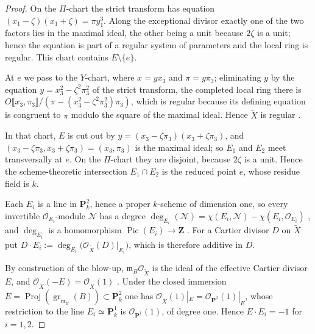 \documentclass[10pt]{amsart}
\DeclareMathOperator{\Pic}{Pic}
\theoremstyle{remark}
\begin{document}
\begin{proof}
	On the \(\Pi\)-chart the strict transform has equation
	\((x_1-\zeta)(x_1+\zeta)=\pi y_1^3\).  Along the exceptional divisor
	exactly one of the two factors lies in the maximal ideal, the other
	being a unit because \(2\zeta\) is a unit; hence the equation is part of a
	regular system of parameters and the local ring is regular.  This chart
	contains \(E\setminus\{e\}\).
	
	At \(e\) we pass to the \(Y\)-chart, where \(x=yx_3\) and
	\(\pi=y\pi_3\); eliminating \(y\) by the equation
	\(y=x_3^2-\zeta^2\pi_3^2\) of the strict transform, the completed local
	ring there is
	\(O\llbracket x_3,\pi_3\rrbracket/(\pi-(x_3^2-\zeta^2\pi_3^2)\pi_3)\),
	which is regular because its defining equation is congruent to \(\pi\)
	modulo the square of the maximal ideal.  Hence \(\widetilde X\) is
	regular \cite[Tag~07NY]{StacksProject}.
	
	In that chart, \(E\) is cut out by
	\(y=(x_3-\zeta\pi_3)(x_3+\zeta\pi_3)\), and
	\((x_3-\zeta\pi_3,x_3+\zeta\pi_3)=(x_3,\pi_3)\) is the maximal ideal;
	so \(E_1\) and \(E_2\) meet transversally at \(e\).  On the
	\(\Pi\)-chart they are disjoint, because \(2\zeta\) is a unit.  Hence the
	scheme-theoretic intersection \(E_1\cap E_2\) is the reduced point
	\(e\), whose residue field is \(k\).
	
	
	
	Each \(E_i\) is a line in \(\mathbf P^2_k\), hence a proper \(k\)-scheme
	of dimension one, so every invertible \(\mathcal O_{E_i}\)-module
	\(\mathcal N\) has a degree
	\(\deg_{E_i}(\mathcal N)=\chi(E_i,\mathcal N)-\chi(E_i,\mathcal O_{E_i})\)
	\cite[Tag~0AYR]{StacksProject}, and \(\deg_{E_i}\) is a homomorphism
	\(\Pic(E_i)\to\mathbf Z\) \cite[Tag~0AYX]{StacksProject}.  For a Cartier
	divisor \(D\) on \(\widetilde X\) put
	\(D\cdot E_i:=\deg_{E_i}\bigl(\mathcal O_{\widetilde X}(D)|_{E_i}\bigr)\),
	which is therefore additive in \(D\).
	
	By construction of the blow-up, \(\mathfrak m_B\mathcal O_{\widetilde X}\)
	is the ideal of the effective Cartier divisor \(E\), and
	\(\mathcal O_{\widetilde X}(-E)=\mathcal O_{\widetilde X}(1)\)
	\cite[Tag~02OS]{StacksProject}.  Under the closed immersion
	\(E=\operatorname{Proj}(\operatorname{gr}_{\mathfrak m_B}(B))
	\subset\mathbf P^2_k\) one has
	\(\mathcal O_{\widetilde X}(1)|_E=\mathcal O_{\mathbf P^2}(1)|_E\), whose
	restriction to the line \(E_i\simeq\mathbf P^1_k\) is
	\(\mathcal O_{\mathbf P^1}(1)\), of degree one.  Hence
	\(E\cdot E_i=-1\) for \(i=1,2\).
	

\end{proof}
\end{document}

